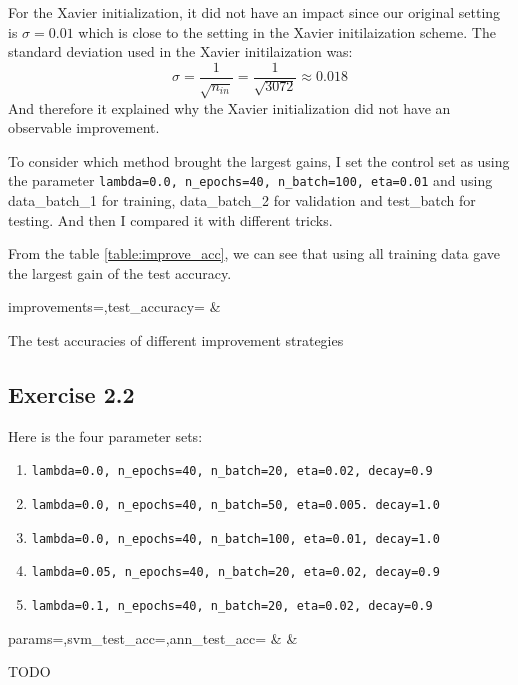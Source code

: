 \documentclass[12pt]{article}
\begin{document}
For the Xavier initialization, it did not have an impact since our original
setting is $\sigma = 0.01$ which is close to the setting in the Xavier initilaization
scheme. The standard deviation used in the Xavier initilaization was:
\begin{equation*}
    \sigma = \frac{1}{\sqrt{n_{in}}} = \frac{1}{\sqrt{3072}} \approx 0.018
\end{equation*}
And therefore it explained why the Xavier initialization did not have an observable
improvement.

To consider which method brought the largest gains, I set the control set as using
the parameter
\texttt{lambda=0.0, n\_epochs=40, n\_batch=100, eta=0.01} and using data\_batch\_1
for training, data\_batch\_2 for validation and test\_batch for testing.
And then I compared it with different tricks.

From the table \ref{table:improve_acc}, we can see that using all training data gave
the largest gain of the test accuracy.
\begin{table}
    \centering
    {improvements=\improve,test_accuracy=\testAcc}
    {\improve & \testAcc}
    \caption{The test accuracies of different improvement strategies}
    \label{table:improve_acc}
\end{table}

\subsection{Exercise 2.2}
Here is the four parameter sets:
\begin{enumerate}
    \item  \texttt{lambda=0.0, n\_epochs=40, n\_batch=20, eta=0.02, decay=0.9}
    \item  \texttt{lambda=0.0, n\_epochs=40, n\_batch=50, eta=0.005. decay=1.0}
    \item  \texttt{lambda=0.0, n\_epochs=40, n\_batch=100, eta=0.01, decay=1.0}
    \item  \texttt{lambda=0.05, n\_epochs=40, n\_batch=20, eta=0.02, decay=0.9}
    \item  \texttt{lambda=0.1, n\_epochs=40, n\_batch=20, eta=0.02, decay=0.9}
\end{enumerate}
\begin{table}
    \centering
    {params=\params,svm_test_acc=\svm,ann_test_acc=\ann}
    {\params & \svm & \ann}
    \caption{TODO}
\end{table}
\end{document}
